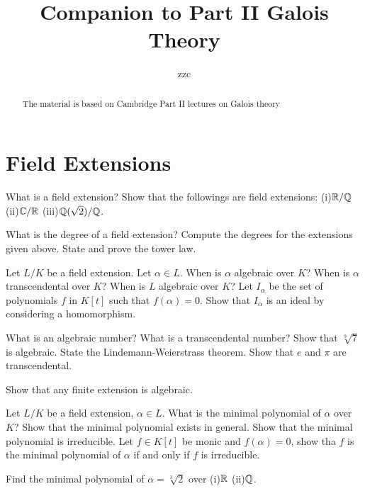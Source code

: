 


\title{Companion to Part II Galois Theory}
\author{zzc}
\maketitle

\rhead{\today}

\begin{abstract}
    The material is based on Cambridge Part II lectures on Galois theory
\end{abstract}
\tableofcontents

\section{Field Extensions}
\begin{question}{1}
    What is a field extension? Show that the followings are field extensions: (i)$\mathbb{R}/\mathbb{Q}$ (ii)$\mathbb{C}/\mathbb{R}$ (iii)$\mathbb{Q}(\sqrt{2})/\mathbb{Q}$.

    What is the degree of a field extension? Compute the degrees for the extensions given above.
    State and prove the tower law.
\end{question}

\begin{question}{2}
    Let $L/K$ be a field extension. Let $\alpha \in L$. When is $\alpha$ algebraic over $K$? When is $\alpha$ transcendental over $K$? When is $L$ algebraic over $K$? Let $I_\alpha$ be the set of polynomials $f$ in $K[t]$ such that $f(\alpha) = 0$. Show that $I_\alpha$ is an ideal by considering a homomorphism.

    What is an algebraic number?  What is a transcendental number? Show that $\sqrt[9]{7}$ is algebraic. State the Lindemann-Weierstrass theorem. Show that $e$ and $\pi$ are transcendental.

    Show that any finite extension is algebraic.
\end{question}

\begin{question}{3}
    Let $L/K$ be a field extension, $\alpha \in L$. What is the minimal polynomial of $\alpha$ over $K$? Show that the minimal polynomial exists in general. Show that the minimal polynomial is irreducible. Let $f \in K[t]$ be monic and $f(\alpha) = 0$, show tha $f$ is the minimal polynomial of $\alpha$ if and only if $f$ is irreducible.   

    Find the minimal polynomial of $\alpha = \sqrt[3]{2}$ over (i)$\mathbb{R}$ (ii)$\mathbb{Q}$. 
\end{question}

